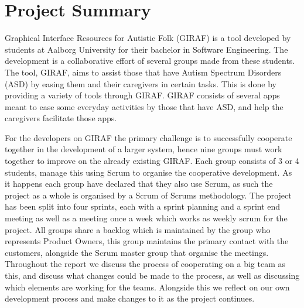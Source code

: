 \section{Project Summary}
Graphical Interface Resources for Autistic Folk (GIRAF) is a tool developed by students at Aalborg University for their bachelor in Software Engineering.
The development is a collaborative effort of several groups made from these students.
The tool, GIRAF, aims to assist those that have Autism Spectrum Disorders (ASD) by easing them and their caregivers in certain tasks.
This is done by providing a variety of tools through GIRAF.
GIRAF consists of several apps meant to ease some everyday activities by those that have ASD, and help the caregivers facilitate those apps.

For the developers on GIRAF the primary challenge is to successfully cooperate together in the development of a larger system, hence nine groups must work together to improve on the already existing GIRAF.
Each group consists of 3 or 4 students, manage this using Scrum to organise the cooperative development.
As it happens each group have declared that they also use Scrum, as such the project as a whole is organised by a Scrum of Scrums methodology.
The project has been split into four sprints, each with a sprint planning and a sprint end meeting as well as a meeting once a week which works as weekly scrum for the project.
All groups share a backlog which is maintained by the group who represents Product Owners, this group maintains the primary contact with the customers, alongside the Scrum master group that organise the meetings.
Throughout the report we discuss the process of cooperating on a big team as this, and discuss what changes could be made to the process, as well as discussing which elements are working for the teams.
Alongside this we reflect on our own development process and make changes to it as the project continues.

